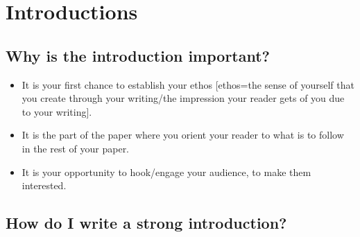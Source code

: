 

\chapter{Introductions}

\section {Why is the introduction important?}
 
\begin{itemize}
\item It is your first chance to establish your ethos [ethos=the sense of yourself that 
you create through your writing/the impression your reader gets of you due to your 
writing].
 
\item It is the part of the paper where you orient your reader to what is to follow in 
the rest of your paper.
 
\item It is your opportunity to hook/engage your audience, to make them interested.
\end{itemize}

\section{How do I write a strong introduction?}

